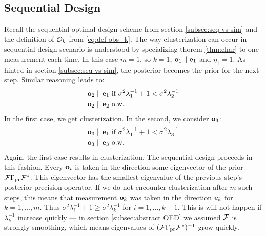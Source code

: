 \documentclass{amsart}
\numberwithin{equation}{section}
\begin{document}
\subsection{Sequential Design}\label{subsec:clusterization sequential}
Recall the sequential optimal design scheme from section
\ref{subsec:seq vs sim} and the definition of $\mathcal{O}_k$ from
\eqref{eq:def obs_k}. The way clusterization can occur in sequential
design scenario is understood by specializing thorem \ref{thm:char} to
one measurement each time. In this case $m=1$, so $k=1$, $\mathbf{o}_1
\parallel \mathbf{e}_1$ and $\eta_1 = 1$. As hinted in section
\ref{subsec:seq vs sim}, the posterior becomes the prior for the next
step. Similar reasoning leads to:
\begin{align*}
  \begin{split}
    \mathbf{o}_2 \parallel \mathbf{e}_1  &\text{ if } \sigma^2 \lambda^{-1}_1 + 1 < \sigma^2\lambda^{-1}_2 \\
    \mathbf{o}_2 \parallel \mathbf{e}_2  &\text{ o.w. }
  \end{split}
\end{align*}
In the first case, we get clusterization. In the second, we consider $\mathbf{o}_3$:
\begin{align*}
  \begin{split}
    \mathbf{o}_3 \parallel \mathbf{e}_1  &\text{ if } \sigma^2 \lambda^{-1}_1 + 1 < \sigma^2\lambda^{-1}_3 \\
    \mathbf{o}_3 \parallel  \mathbf{e}_3  &\text{ o.w. }
  \end{split}
\end{align*}
Again, the first case results in clusterization. The sequential design
proceeds in this fashion. Every $\mathbf{o}_i$ is taken in the direction
some eigenvector of the prior $\mathcal{F} \Gamma_{\textup{pr}}\mathcal{F}^*$. This eigenvector
has the smallest eigenvalue of the previous step's posterior precision
operator. If we do not encounter clusterization after $m$ such steps,
this means that measurement $\mathbf{o}_k$ was taken in the direction
$\mathbf{e}_k$ for $k=1,\dots,m$. Thus $\sigma^2\lambda_i^{-1} + 1 \geq
\sigma^2\lambda_k^{-1}$ for $i=1,\dots,k-1$. This is will not happen if
$\lambda_k^{-1}$ increase quickly --- in section \ref{subsec:abstract
  OED} we assumed $\mathcal{F}$ is strongly smoothing, which means
eigenvalues of $(\mathcal{F} \Gamma_{\textup{pr}}\mathcal{F}^*)^{-1}$ grow quickly.
\end{document}
